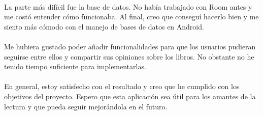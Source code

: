 \documentclass[a4paper,12pt]{report}
\begin{document}
    \paragraph*{}{La parte más difícil fue la base de datos. No había trabajado con Room antes y me costó entender cómo funcionaba. Al final, creo que conseguí hacerlo bien y me siento más cómodo con el manejo de bases de datos en Android\cite{sqlite_android}.}
    \paragraph*{}{Me hubiera gustado poder añadir funcionalidades para que los usuarios pudieran seguirse entre ellos y compartir sus opiniones sobre los libros. No obstante no he tenido tiempo suficiente para implementarlas.}
    \paragraph*{}{En general, estoy satisfecho con el resultado y creo que he cumplido con los objetivos del proyecto. Espero que esta aplicación sea útil para los amantes de la lectura y que pueda seguir mejorándola en el futuro.}
  
  \printbibliography[title=Bibliografía]
\end{document}
